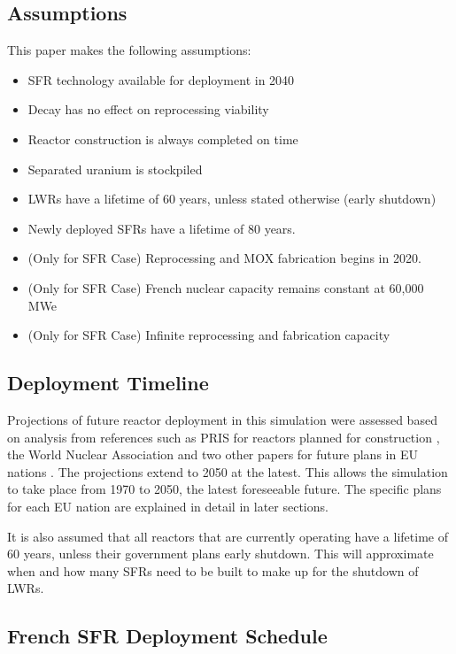 \subsection{Assumptions}
This paper makes the following assumptions:
\begin{itemize}
	\item \gls{SFR} technology available for deployment in 2040
	\item Decay has no effect on reprocessing viability
	\item Reactor construction is always completed on time 
	\item Separated uranium is stockpiled
	\item \glspl{LWR} have a lifetime of 60 years, unless stated otherwise (early shutdown)
	\item Newly deployed \glspl{SFR} have a lifetime of 80 years.
	\item (Only for SFR Case) Reprocessing and \gls{MOX} fabrication begins in 2020.
	\item (Only for SFR Case) French nuclear capacity remains constant at 60,000 MWe
	\item (Only for SFR Case) Infinite reprocessing and fabrication capacity
\end{itemize}


\subsection{Deployment Timeline}
Projections of future reactor deployment in this simulation were
assessed based on analysis from references such as \gls{PRIS} for reactors planned for construction \cite{iaea_pris_nodate},
the World Nuclear Association and two other papers for future plans in EU nations
\cite{world_nuclear_association_nuclear_2017, joskow_future_2012, hatch_politics_2015}.
The projections extend to 2050 at the latest. This allows the simulation to take place from
1970 to 2050, the latest foreseeable future. The specific plans for each \gls{EU} nation are explained
in detail in later sections.

It is also assumed that all reactors that are 
currently operating have a lifetime of 60 years, unless their government plans
early shutdown. This will approximate when and how many \glspl{SFR} need to be built
to make up for the shutdown of \glspl{LWR}.


\subsection{French \gls{SFR} Deployment Schedule}


